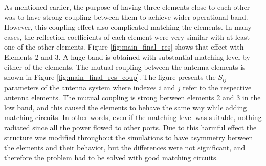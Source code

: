 As mentioned earlier, the purpose of having three elements close to each other was to have strong coupling between them to achieve wider operational band. However, this coupling effect also complicated matching the elements. In many cases, the reflection coefficients of each element were very similar with at least one of the other elements. Figure \ref{fig:main_final_res} shows that effect with Elements 2 and 3. A huge band is obtained with substantial matching level by either of the elements. The mutual coupling between the antenna elements is shown in Figure \ref{fig:main_final_res_coup}. The figure presents the $S_{ij}$-parameters of the antenna system where indexes $i$ and $j$ refer to the respective antenna elements. The mutual coupling is strong between elements 2 and 3 in the low band, and this caused the elements to behave the same way while adding matching circuits. In other words, even if the matching level was suitable, nothing radiated since all the power flowed to other ports. Due to this harmful effect the structure was modified throughout the simulations to have asymmetry between the elements and their behavior, but the differences were not significant, and therefore the problem had to be solved with good matching circuits.

